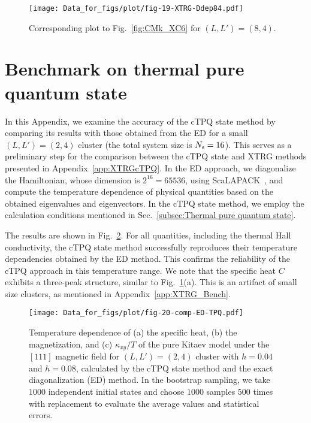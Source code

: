 \documentclass[twocolumn,superscriptaddress,showpacs, longbibliography, aps, prx]{revtex4-2}
\begin{document}
\begin{figure}
  \begin{center}
    \texttt{[image: Data\_for\_figs/plot/fig-19-XTRG-Ddep84.pdf]}
  \end{center}
  \caption{Corresponding plot to Fig.~\ref{fig:CMk_XC6} for $(L, L') = (8, 4)$.} 
  \label{fig:CMk_XC4}
\end{figure}

\section{Benchmark on thermal pure quantum state}
\label{app:cTPQ}
In this Appendix, we examine the accuracy of the cTPQ state method by comparing its results with those obtained from the ED for a small $(L, L') = (2, 4)$ cluster (the total system size is $N_{\rm s}=16$).
This serves as a preliminary step for the comparison between the cTPQ state and XTRG methods presented in Appendix~\ref{app:XTRGcTPQ}. 
In the ED approach, we diagonalize the Hamiltonian, whose dimension is
$2^{16}=65536$, using ScaLAPACK~\cite{scalapack}, and compute the temperature dependence of physical quantities based on the obtained eigenvalues and eigenvectors.
In the cTPQ state method, we employ the calculation conditions mentioned in Sec.~\ref{subsec:Thermal pure quantum state}.

The results are shown in Fig.~\ref{comp_ED}. 
For all quantities, including the thermal Hall conductivity, the cTPQ state method successfully reproduces their temperature dependencies obtained by the ED method. 
This confirms the reliability of the cTPQ approach in this temperature range. 
We note that the specific heat $C$ exhibits a three-peak structure, similar to Fig.~\ref{fig:CMk_XC4}(a). This is an artifact of small size clusters, as mentioned in Appendix~\ref{app:XTRG_Bench}. 

\begin{figure}[t] 
\begin{center} 
\texttt{[image: Data\_for\_figs/plot/fig-20-comp-ED-TPQ.pdf]}
\vspace{-0.5cm} 
\caption{Temperature dependence of (a) the specific heat, (b) the magnetization, and (c) $\kappa_{xy}/T$ of the pure Kitaev model under the $[111]$ magnetic field for $(L, L') = (2, 4)$ cluster with $h=0.04$ and $h=0.08$, calculated by the cTPQ state method and the exact diagonalization (ED) method.
In the bootstrap sampling, we take $1000$ independent initial states and choose $1000$ samples $500$ times with replacement to evaluate the average values and statistical errors. 
}
\label{comp_ED}
\end{center}
\end{figure}
\end{document}
